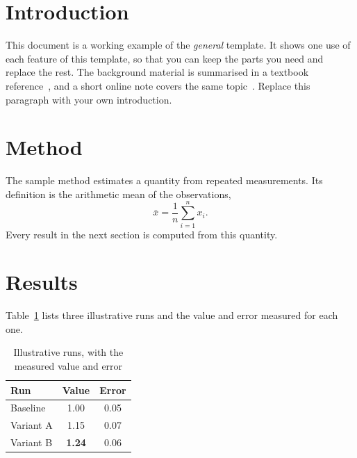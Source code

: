 
\section{Introduction}
This document is a working example of the \textit{general} template. It shows
one use of each feature of this template, so that you can keep the parts you
need and replace the rest. The background material is summarised in a
textbook reference~\cite{example2}, and a short online note covers the same
topic~\cite{example3}. Replace this paragraph with your own introduction.

\section{Method}
The sample method estimates a quantity from repeated measurements. Its
definition is the arithmetic mean of the observations,
\begin{equation}
  \bar{x} = \frac{1}{n} \sum_{i=1}^{n} x_i .
  \label{eq:mean}
\end{equation}
Every result in the next section is computed from this quantity.

\section{Results}
Table~\ref{tab:runs} lists three illustrative runs and the value and error
measured for each one.
\begin{table}[H]
  \centering
  \caption{Illustrative runs, with the measured value and error}
  \label{tab:runs}
  \begin{tabular}{lcc}
    \toprule
    Run & Value & Error \\
    \midrule
    Baseline & 1.00 & 0.05 \\
    Variant A & 1.15 & 0.07 \\
    Variant B & \textbf{1.24} & 0.06 \\
    \bottomrule
  \end{tabular}
\end{table}

